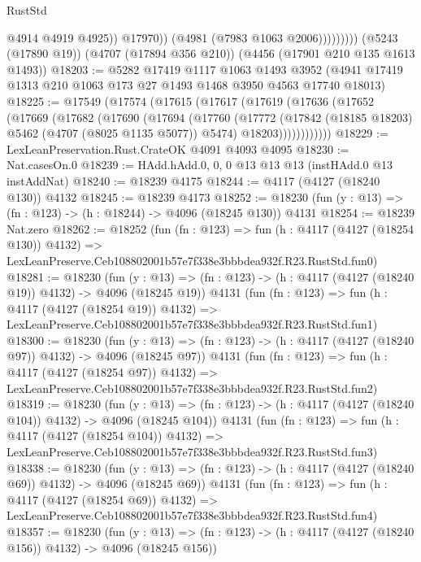 \begin{lexlean}{RustStd}
\begin{coremodule}
                          @4914
                          @4919
                          @4925))
                      @17970))
                  (@4981 (@7983 @1063 @2006)))))))))
    (@5243 (@17890 @19))
    (@4707 (@17894 @356 @210))
    (@4456 (@17901 @210 @135 @1613 @1493))
@18203 := @5282
    @17419
    @1117
    @1063
    @1493
    @3952
    (@4941 @17419 @1313 @210 @1063 @173 @27 @1493 @1468 @3950 @4563 @17740 @18013)
@18225 := @17549
    (@17574
      (@17615
        (@17617
          (@17619
            (@17636
              (@17652
                (@17669
                  (@17682
                    (@17690
                      (@17694
                        (@17760
                          (@17772
                            (@17842 (@18185 @18203) @5462 (@4707 (@8025 @1135 @5077)) @5474)
                            @18203))))))))))))
@18229 := LexLeanPreservation.Rust.CrateOK @4091 @4093 @4095
@18230 := Nat.casesOn.{0}
@18239 := HAdd.hAdd.{0, 0, 0} @13 @13 @13 (instHAdd.{0} @13 instAddNat)
@18240 := @18239 @4175
@18244 := @4117 (@4127 (@18240 @130)) @4132
@18245 := @18239 @4173
@18252 := @18230 (fun (y : @13) => (fn : @123) -> (h : @18244) -> @4096 (@18245 @130)) @4131
@18254 := @18239 Nat.zero
@18262 := @18252
    (fun (fn : @123) =>
    fun (h : @4117 (@4127 (@18254 @130)) @4132) =>
    LexLeanPreserve.Ceb108802001b57e7f338e3bbbdea932f.R23.RustStd.fun0)
@18281 := @18230
    (fun (y : @13) => (fn : @123) -> (h : @4117 (@4127 (@18240 @19)) @4132) -> @4096 (@18245 @19))
    @4131
    (fun (fn : @123) =>
    fun (h : @4117 (@4127 (@18254 @19)) @4132) =>
    LexLeanPreserve.Ceb108802001b57e7f338e3bbbdea932f.R23.RustStd.fun1)
@18300 := @18230
    (fun (y : @13) => (fn : @123) -> (h : @4117 (@4127 (@18240 @97)) @4132) -> @4096 (@18245 @97))
    @4131
    (fun (fn : @123) =>
    fun (h : @4117 (@4127 (@18254 @97)) @4132) =>
    LexLeanPreserve.Ceb108802001b57e7f338e3bbbdea932f.R23.RustStd.fun2)
@18319 := @18230
    (fun (y : @13) => (fn : @123) -> (h : @4117 (@4127 (@18240 @104)) @4132) -> @4096 (@18245 @104))
    @4131
    (fun (fn : @123) =>
    fun (h : @4117 (@4127 (@18254 @104)) @4132) =>
    LexLeanPreserve.Ceb108802001b57e7f338e3bbbdea932f.R23.RustStd.fun3)
@18338 := @18230
    (fun (y : @13) => (fn : @123) -> (h : @4117 (@4127 (@18240 @69)) @4132) -> @4096 (@18245 @69))
    @4131
    (fun (fn : @123) =>
    fun (h : @4117 (@4127 (@18254 @69)) @4132) =>
    LexLeanPreserve.Ceb108802001b57e7f338e3bbbdea932f.R23.RustStd.fun4)
@18357 := @18230
    (fun (y : @13) => (fn : @123) -> (h : @4117 (@4127 (@18240 @156)) @4132) -> @4096 (@18245 @156))

\end{coremodule}
\end{lexlean}
